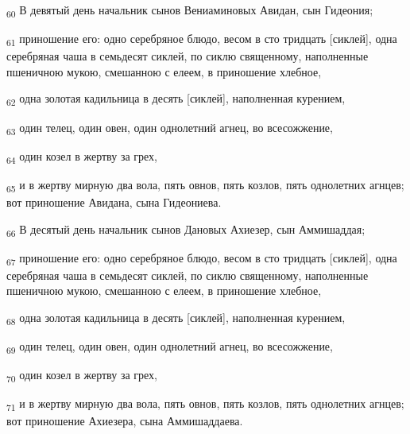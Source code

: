 \begin{tcolorbox}
\textsubscript{60} В девятый день начальник сынов Вениаминовых Авидан, сын Гидеония;
\end{tcolorbox}
\begin{tcolorbox}
\textsubscript{61} приношение его: одно серебряное блюдо, весом в сто тридцать [сиклей], одна серебряная чаша в семьдесят сиклей, по сиклю священному, наполненные пшеничною мукою, смешанною с елеем, в приношение хлебное,
\end{tcolorbox}
\begin{tcolorbox}
\textsubscript{62} одна золотая кадильница в десять [сиклей], наполненная курением,
\end{tcolorbox}
\begin{tcolorbox}
\textsubscript{63} один телец, один овен, один однолетний агнец, во всесожжение,
\end{tcolorbox}
\begin{tcolorbox}
\textsubscript{64} один козел в жертву за грех,
\end{tcolorbox}
\begin{tcolorbox}
\textsubscript{65} и в жертву мирную два вола, пять овнов, пять козлов, пять однолетних агнцев; вот приношение Авидана, сына Гидеониева.
\end{tcolorbox}
\begin{tcolorbox}
\textsubscript{66} В десятый день начальник сынов Дановых Ахиезер, сын Аммишаддая;
\end{tcolorbox}
\begin{tcolorbox}
\textsubscript{67} приношение его: одно серебряное блюдо, весом в сто тридцать [сиклей], одна серебряная чаша в семьдесят сиклей, по сиклю священному, наполненные пшеничною мукою, смешанною с елеем, в приношение хлебное,
\end{tcolorbox}
\begin{tcolorbox}
\textsubscript{68} одна золотая кадильница в десять [сиклей], наполненная курением,
\end{tcolorbox}
\begin{tcolorbox}
\textsubscript{69} один телец, один овен, один однолетний агнец, во всесожжение,
\end{tcolorbox}
\begin{tcolorbox}
\textsubscript{70} один козел в жертву за грех,
\end{tcolorbox}
\begin{tcolorbox}
\textsubscript{71} и в жертву мирную два вола, пять овнов, пять козлов, пять однолетних агнцев; вот приношение Ахиезера, сына Аммишаддаева.
\end{tcolorbox}
